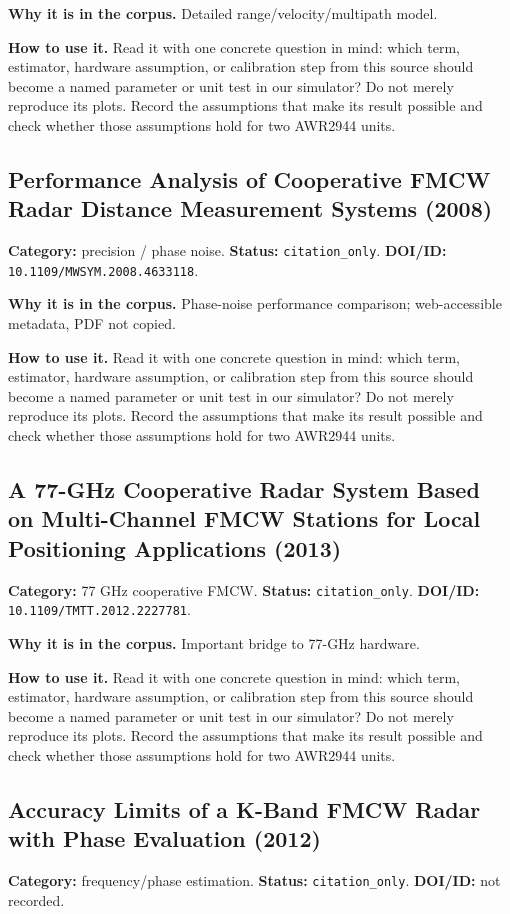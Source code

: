 \documentclass[11pt]{article}
\begin{document}
\textbf{Why it is in the corpus.} Detailed range/velocity/multipath model.

\textbf{How to use it.} Read it with one concrete question in mind: which term, estimator, hardware assumption, or calibration step from this source should become a named parameter or unit test in our simulator? Do not merely reproduce its plots. Record the assumptions that make its result possible and check whether those assumptions hold for two AWR2944 units.

\subsection*{Performance Analysis of Cooperative FMCW Radar Distance Measurement Systems (2008)}
\textbf{Category:} precision / phase noise. \textbf{Status:} \nolinkurl{citation_only}. \textbf{DOI/ID:} \nolinkurl{10.1109/MWSYM.2008.4633118}.

\textbf{Why it is in the corpus.} Phase-noise performance comparison; web-accessible metadata, PDF not copied.

\textbf{How to use it.} Read it with one concrete question in mind: which term, estimator, hardware assumption, or calibration step from this source should become a named parameter or unit test in our simulator? Do not merely reproduce its plots. Record the assumptions that make its result possible and check whether those assumptions hold for two AWR2944 units.

\subsection*{A 77-GHz Cooperative Radar System Based on Multi-Channel FMCW Stations for Local Positioning Applications (2013)}
\textbf{Category:} 77 GHz cooperative FMCW. \textbf{Status:} \nolinkurl{citation_only}. \textbf{DOI/ID:} \nolinkurl{10.1109/TMTT.2012.2227781}.

\textbf{Why it is in the corpus.} Important bridge to 77-GHz hardware.

\textbf{How to use it.} Read it with one concrete question in mind: which term, estimator, hardware assumption, or calibration step from this source should become a named parameter or unit test in our simulator? Do not merely reproduce its plots. Record the assumptions that make its result possible and check whether those assumptions hold for two AWR2944 units.

\subsection*{Accuracy Limits of a K-Band FMCW Radar with Phase Evaluation (2012)}
\textbf{Category:} frequency/phase estimation. \textbf{Status:} \nolinkurl{citation_only}. \textbf{DOI/ID:} not recorded.
\end{document}
